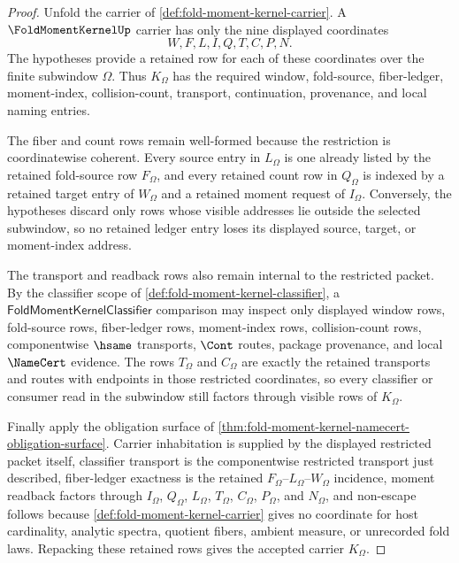 \begin{proof}
Unfold the carrier of \autoref{def:fold-moment-kernel-carrier}. A
$\FoldMomentKernelUp$ carrier has only the nine displayed coordinates
$$
W,F,L,I,Q,T,C,P,N.
$$
The hypotheses provide a retained row for each of these coordinates over the
finite subwindow $\Omega$. Thus $K_{\Omega}$ has the required window,
fold-source, fiber-ledger, moment-index, collision-count, transport,
continuation, provenance, and local naming entries.

The fiber and count rows remain well-formed because the restriction is
coordinatewise coherent. Every source entry in $L_{\Omega}$ is one already
listed by the retained fold-source row $F_{\Omega}$, and every retained count
row in $Q_{\Omega}$ is indexed by a retained target entry of $W_{\Omega}$ and a
retained moment request of $I_{\Omega}$. Conversely, the hypotheses discard only
rows whose visible addresses lie outside the selected subwindow, so no retained
ledger entry loses its displayed source, target, or moment-index address.

The transport and readback rows also remain internal to the restricted packet.
By the classifier scope of \autoref{def:fold-moment-kernel-classifier}, a
$\mathsf{FoldMomentKernelClassifier}$ comparison may inspect only displayed
window rows, fold-source rows, fiber-ledger rows, moment-index rows,
collision-count rows, componentwise $\hsame$ transports, $\Cont$ routes,
package provenance, and local $\NameCert$ evidence. The rows $T_{\Omega}$ and
$C_{\Omega}$ are exactly the retained transports and routes with endpoints in
those restricted coordinates, so every classifier or consumer read in the
subwindow still factors through visible rows of $K_{\Omega}$.

Finally apply the obligation surface of
\autoref{thm:fold-moment-kernel-namecert-obligation-surface}. Carrier
inhabitation is supplied by the displayed restricted packet itself, classifier
transport is the componentwise restricted transport just described,
fiber-ledger exactness is the retained $F_{\Omega}$--$L_{\Omega}$--$W_{\Omega}$
incidence, moment readback factors through $I_{\Omega}$, $Q_{\Omega}$,
$L_{\Omega}$, $T_{\Omega}$, $C_{\Omega}$, $P_{\Omega}$, and $N_{\Omega}$, and
non-escape follows because \autoref{def:fold-moment-kernel-carrier} gives no
coordinate for host cardinality, analytic spectra, quotient fibers, ambient
measure, or unrecorded fold laws. Repacking these retained rows gives the
accepted carrier $K_{\Omega}$.
\end{proof}
